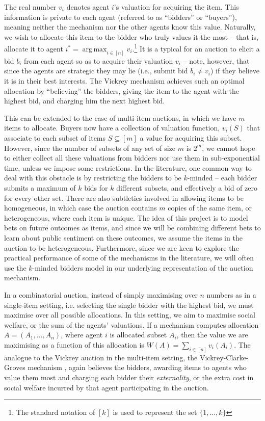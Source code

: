 \documentclass[10pt,a4paper]{article}
\theoremstyle{plain}
\theoremstyle{definition}
\DeclareMathOperator*{\argmax}{arg\,max}
\begin{document}
	The real number $v_i$ denotes agent $i$'s valuation for acquiring the item.
	This information is private to each agent (referred to as ``bidders'' or
	``buyers''), meaning neither the mechanism nor the other agents know this
	value. Naturally, we wish to allocate this item to the bidder who truly
	values it the most -- that is, allocate it to agent $i^* = \argmax_{i \in
	[n]} v_i$.\footnote{The standard notation of $[k]$ is used to represent the
	set $\{ 1, \ldots, k \}$} It is a typical for an auction to elicit a bid
	$b_i$ from each agent so as to acquire their valuation $v_i$ -- note,
	however, that since the agents are strategic they may lie (i.e., submit bid
	$b_i \neq v_i$) if they believe it is in their best interests. The Vickrey
	mechanism \cite{Vickrey1961} achieves such an optimal allocation by
	``believing'' the bidders, giving the item to the agent with the highest
	bid, and charging him the next highest bid.

	This can be extended to the case of multi-item auctions, in which we have
	$m$ items to allocate. Buyers now have a collection of valuation function,
	$v_i(S)$ that associate to each subset of items $S \subseteq [m]$ a value
	for acquiring this subset. However, since the number of subsets of any set
	of size $m$ is $2^m$, we cannot hope to either collect all these valuations
	from bidders nor use them in sub-exponential time, unless we impose some
	restrictions. In the literature, one common way to deal with this obstacle
	is by restricting the bidders to be $k$-minded -- each bidder submits a
	maximum of $k$ bids for $k$ different subsets, and effectively a bid of
	zero for every other set. There are also subtleties involved in allowing
	items to be homogeneous, in which case the auction contains $m$ copies of
	the same item, or heterogeneous, where each item is unique. The idea of
	this project is to model bets on future outcomes as items, and since we
	will be combining different bets to learn about public sentiment on these
	outcomes, we assume the items in the auction to be heterogeneous.
	Furthermore, since we are keen to explore the practical performance of some
	of the mechanisms in the literature, we will often use the $k$-minded
	bidders model in our underlying representation of the auction mechanism.

	In a combinatorial auction, instead of simply maximising over $n$ numbers
	as in a single-item setting, i.e. selecting the single bidder with the
	highest bid, we must maximise over all possible allocations. In this
	setting, we aim to maximise social welfare, or the sum of the agents'
	valuations. If a mechanism computes allocation $A = (A_1, \ldots, A_n)$,
	where agent $i$ is allocated subset $A_i$, then the value we are maximising
	as a function of this allocation is $W(A) = \sum_{i \in [n]} v_i(A_i)$. The
	analogue to the Vickrey auction in the multi-item setting, the
	Vickrey-Clarke-Groves mechanism \cite{Vickrey1961, Clarke1971, Groves1973},
	again believes the bidders, awarding items to agents who value them most
	and charging each bidder their \emph{externality}, or the extra cost in
	social welfare incurred by that agent participating in the auction.
\end{document}
